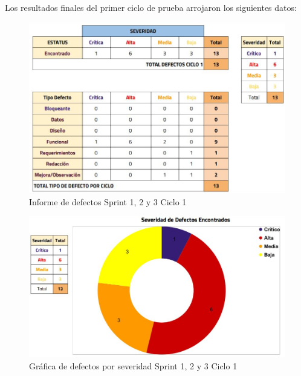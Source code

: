 \newpage

Los resultados finales del primer ciclo de prueba arrojaron los siguientes datos:

\begin{figure}[H]
	\begin{center}
		\includegraphics[width=.95\textwidth]{images/pruebas/s1c1}
		\caption{Informe de defectos Sprint 1, 2 y 3 Ciclo 1}
		\label{fig:infos1c1}
	\end{center}
\end{figure}

\newpage

\begin{figure}[H]
	\begin{center}
		\includegraphics[width=.85\textwidth]{images/pruebas/s1c1-1}
		\caption{Gráfica de defectos por severidad Sprint 1, 2 y 3 Ciclo 1}
		\label{fig:infos1c1-1}
	\end{center}
\end{figure}

